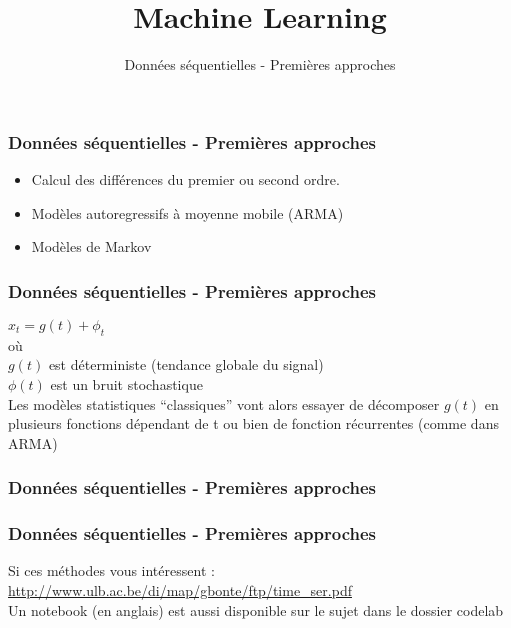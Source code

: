 \documentclass{formation}
\title{Machine Learning}
\subtitle{Données séquentielles - Premières approches }
\begin{document}
\maketitle

\begin{frame}
  \frametitle{Données séquentielles - Premières approches }
  \begin{itemize}
  \item Calcul des différences du premier ou second ordre.
  \item Modèles autoregressifs à moyenne mobile (ARMA)
  \item Modèles de Markov 
  \end{itemize}
\end{frame}

\begin{frame}
  \frametitle{Données séquentielles - Premières approches }
  
  $x_t=g(t)+\phi_t$ \\
  où \\
  $g(t)$ est déterministe (tendance globale du signal) \\
  $\phi(t)$ est un bruit stochastique \\
  \newline
  Les modèles statistiques ``classiques'' vont alors essayer de décomposer $g(t)$ en plusieurs fonctions dépendant de t ou bien de fonction récurrentes (comme dans ARMA)
\end{frame}

\begin{frame}
  \frametitle{Données séquentielles - Premières approches }
\end{frame}

\begin{frame}
  \frametitle{Données séquentielles - Premières approches }
  Si ces méthodes vous intéressent : \\
  \newline
  \url{http://www.ulb.ac.be/di/map/gbonte/ftp/time_ser.pdf} \\
  \newline
  Un notebook (en anglais) est aussi disponible sur le sujet dans le dossier codelab
\end{frame}
\end{document}
